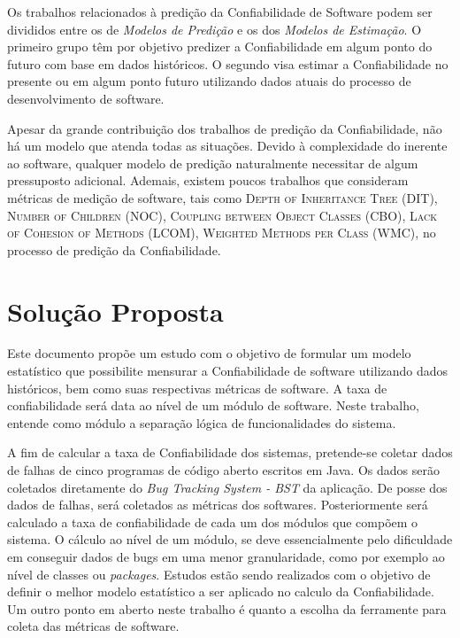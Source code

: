 \documentclass[12pt]{article}
\begin{document}
Os trabalhos relacionados à predição da Confiabilidade de Software podem ser divididos entre os de \textit{Modelos de Predição} e os dos \textit{Modelos de Estimação}{}\cite{Lyu:2007:SRE:1253532.1254716}{}. O primeiro grupo têm por objetivo predizer a Confiabilidade em algum ponto do futuro com base em dados históricos. O segundo visa estimar a Confiabilidade no presente ou em algum ponto futuro utilizando dados atuais do processo de desenvolvimento de software.

Apesar da grande contribuição dos trabalhos de predição da Confiabilidade, não há um modelo que atenda todas as situações. Devido à complexidade do inerente ao software, qualquer modelo de predição naturalmente necessitar de algum pressuposto adicional. Ademais, existem poucos trabalhos que consideram métricas de medição de software, tais como \textsc{Depth of Inheritance Tree (DIT), Number of Children (NOC), Coupling between Object Classes (CBO), Lack of Cohesion of Methods (LCOM), Weighted Methods per Class (WMC)}, no processo de predição da Confiabilidade. 

\section{Solução Proposta}
\label{sec:proposta}

Este documento propõe um estudo com o objetivo de formular um modelo estatístico que possibilite mensurar a Confiabilidade de software utilizando dados históricos, bem como suas respectivas métricas de software. A taxa de confiabilidade será data ao nível de um módulo de software. Neste trabalho, entende como módulo a separação lógica de funcionalidades do sistema.

A fim de calcular a taxa de Confiabilidade dos sistemas, pretende-se coletar dados de falhas de cinco programas de código aberto escritos em Java. Os dados serão coletados diretamente do \textit{Bug Tracking System - BST}{} da aplicação. De posse dos dados de falhas, será coletados as métricas dos softwares. Posteriormente será calculado a taxa de confiabilidade de cada um dos módulos que compõem o sistema. O cálculo ao nível de um módulo, se deve essencialmente pelo dificuldade em conseguir dados de bugs em uma menor granularidade, como por exemplo ao nível de classes ou \textit{packages}{}. Estudos estão sendo realizados com o objetivo de definir o melhor modelo estatístico a ser aplicado no calculo da Confiabilidade. Um outro ponto em aberto neste trabalho é quanto a escolha da ferramente para coleta das métricas de software.
\end{document}
